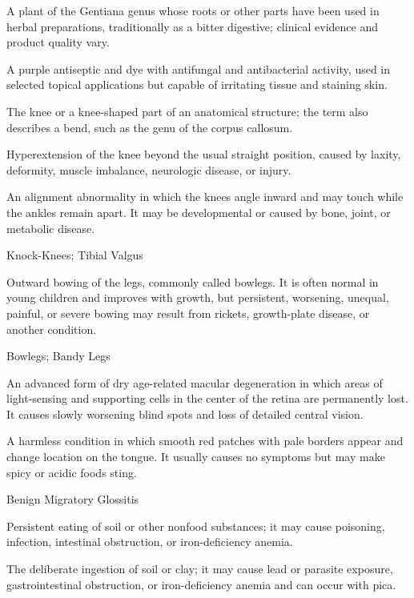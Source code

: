  A plant of the Gentiana genus whose roots or other parts have been used in herbal preparations, traditionally as a bitter digestive; clinical evidence and product quality vary.

 A purple antiseptic and dye with antifungal and antibacterial activity, used in selected topical applications but capable of irritating tissue and staining skin.

 The knee or a knee-shaped part of an anatomical structure; the term also describes a bend, such as the genu of the corpus callosum.

 Hyperextension of the knee beyond the usual straight position, caused by laxity, deformity, muscle imbalance, neurologic disease, or injury.

 An alignment abnormality in which the knees angle inward and may touch while the ankles remain apart. It may be developmental or caused by bone, joint, or metabolic disease.

\synonyms
Knock-Knees; Tibial Valgus

 Outward bowing of the legs, commonly called bowlegs. It is often normal in young children and improves with growth, but persistent, worsening, unequal, painful, or severe bowing may result from rickets, growth-plate disease, or another condition.

\synonyms
Bowlegs; Bandy Legs

 An advanced form of dry age-related macular degeneration in which areas of light-sensing and supporting cells in the center of the retina are permanently lost. It causes slowly worsening blind spots and loss of detailed central vision.

 A harmless condition in which smooth red patches with pale borders appear and change location on the tongue. It usually causes no symptoms but may make spicy or acidic foods sting.


\synonyms
Benign Migratory Glossitis

 Persistent eating of soil or other nonfood substances; it may cause poisoning, infection, intestinal obstruction, or iron-deficiency anemia.

 The deliberate ingestion of soil or clay; it may cause lead or parasite exposure, gastrointestinal obstruction, or iron-deficiency anemia and can occur with pica.

